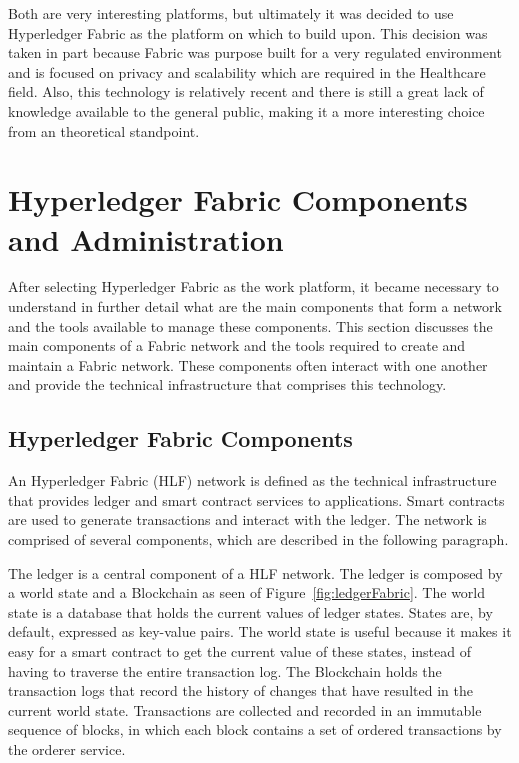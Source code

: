 Both are very interesting platforms, but ultimately it was decided to use
Hyperledger Fabric as the platform on which to build upon. This decision was
taken in part because Fabric was purpose built for a very regulated environment
and is focused on privacy and scalability which are required in the Healthcare
field. Also, this technology is relatively recent and there is still a great
lack of knowledge available to the general public, making it a more interesting
choice from an theoretical standpoint.

\section{Hyperledger Fabric Components and Administration}

After selecting Hyperledger Fabric as the work platform, it became necessary to
understand in further detail what are the main components that form a network
and the tools available to manage these components. This section discusses the
main components of a Fabric network and the tools required to create and
maintain a Fabric network. These components often interact with one another and
provide the technical infrastructure that comprises this technology.

\subsection{Hyperledger Fabric Components}

An Hyperledger Fabric (HLF) network is defined as the technical infrastructure
that provides ledger and smart contract services to applications. Smart
contracts are used to generate transactions and interact with the ledger. The
network is comprised of several components, which are described in the
following paragraph.

The ledger is a central component of a HLF network. The ledger is composed by a
world state and a Blockchain as seen of Figure~\ref{fig:ledgerFabric}. The
world state is a database that holds the current values of ledger states.
States are, by default, expressed as key-value pairs. The world state is useful
because it makes it easy for a smart contract to get the current value of these
states, instead of having to traverse the entire transaction log. The
Blockchain holds the transaction logs that record the history of changes that
have resulted in the current world state.  Transactions are collected and
recorded in an immutable sequence of blocks, in which each block contains a set
of ordered transactions by the orderer service.

